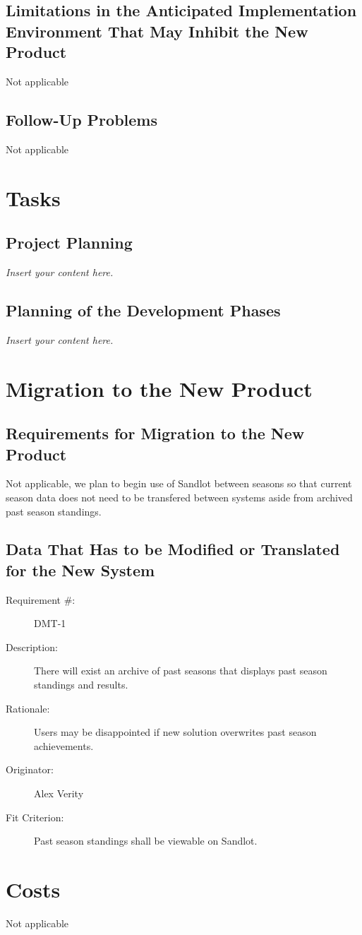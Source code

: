 \documentclass[12pt]{article}
\newenvironment{myreq}[1]{%
\setlist[description]{font=\normalfont\color{darkgray}}%
\begin{tcolorbox}[colframe=black,colback=white, sharp corners, boxrule=1pt]%
\bfseries\color{blue}%
\begin{description}#1}%
{\end{description}\end{tcolorbox}}
\newcommand{\twoinline}[2]{\begin{multicols}{2}#1 #2\end{multicols}}
\newcommand{\reqno}{\item[Requirement \#:]}
\newcommand{\reqdesc}{\item[Description:]}
\newcommand{\reqrat}{\item[Rationale:]}
\newcommand{\reqorig}{\item[Originator:]}
\newcommand{\reqfit}{\item[Fit Criterion:]}
\newcommand{\reqsatis}{\item[Customer Satisfaction:]}
\newcommand{\reqdissat}{\item[Customer Dissatisfaction:]}
\newcommand{\lips}{\textit{Insert your content here.}}
\begin{document}
\subsection{Limitations in the Anticipated Implementation Environment That May
Inhibit the New Product}
Not applicable
\subsection{Follow-Up Problems}
Not applicable

\section{Tasks}
\subsection{Project Planning}
\lips
\subsection{Planning of the Development Phases}
\lips

\section{Migration to the New Product}
\subsection{Requirements for Migration to the New Product}
Not applicable, we plan to begin use of Sandlot between seasons so that
current season data does not need to be transfered between systems aside from
archived past season standings.

\subsection{Data That Has to be Modified or Translated for the New System}

\begin{myreq}
  \reqno DMT-1
  \reqdesc There will exist an archive of past seasons that displays past
  season standings and results.
  \reqrat Users may be disappointed if new solution overwrites past season
  achievements.
  \reqorig Alex Verity
  \reqfit Past season standings shall be viewable on Sandlot.
  \twoinline
    {\reqsatis 1}
    {\reqdissat 2}
\end{myreq}

\section{Costs}
Not applicable
\end{document}
